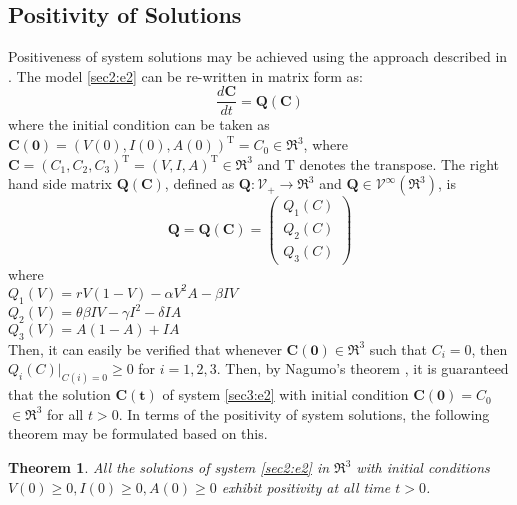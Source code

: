 \documentclass[12pt,a4wide]{report}
\newtheorem{theorem}{Theorem}[section]
\numberwithin{equation}{chapter}
\numberwithin{theorem}{chapter}
\begin{document}
\subsection{Positivity of Solutions}
Positiveness of system solutions may be achieved using the approach described in \cite{gakkhar2012control}. The model \eqref{sec2:e2} can be re-written in matrix form as:
\begin{equation}\label{sec3:e1}
\frac{d\mathbf{C}}{dt}=\mathbf{Q}(\mathbf{C})
\end{equation}
where the initial condition can be taken as $\mathbf{C(0)}=(V(0), I(0), A(0))^\mathrm{T}=C_{0}\in\Re^3$, where $\mathbf{C}=(C_1, C_2, C_3)^\mathrm{T}=(V,I,A)^\mathrm{T} \in\Re^3$ and  $\mathrm{T}$ denotes the transpose. The right hand side matrix $\mathbf{Q}(\mathbf{C})$, defined as $\mathbf{Q}: \mathcal{V_+}\rightarrow \Re^3$ and $\mathbf{Q}\in\mathcal{V}^{\infty}(\Re^3)$, is
\begin{equation} \label{sec3:e2}
\mathbf{Q}=\mathbf{Q}(\mathbf{C})=
\left({\begin{matrix}
Q_1(C)\\
Q_2(C)\\
Q_3(C)
\end{matrix}}\right)
\end{equation}
where \\
$Q_1(V)=rV(1-V)-\alpha V^2A - \beta IV$\\
$Q_2(V)=\theta \beta IV - \gamma I^2 - \delta IA$\\
$Q_3(V)=A(1-A)+IA$\\
Then, it can easily be verified that whenever $\mathbf{C(0)}\in\Re^3$ such that $C_{i}=0$, then $Q_{i}(C)|_{C(i)=0}\geq 0$ for $i=1,2,3$. Then, by Nagumo's theorem \cite{nagumo1942},  it is guaranteed that the solution $\mathbf{ C(t)}$ of system \eqref{sec3:e2} with initial condition $\mathbf{C(0)}=C_0$ $\in \Re^3 $ for all $t > 0$. In terms of the positivity of system solutions, the following theorem may be formulated based on this.
\begin{theorem}\label{Theorem 3.1}
All the solutions of system \eqref{sec2:e2} in $\Re^3$ with initial conditions $V(0) \geq 0, I(0)\geq 0, A(0)\geq 0$ exhibit positivity at all time $t>0$.
\end{theorem}
\end{document}
